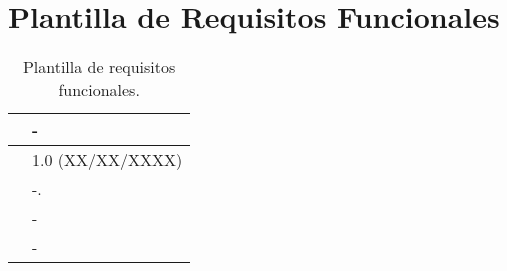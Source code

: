 \section{Plantilla de Requisitos Funcionales}

\begin{table}[H]
\begin{center}
\begin{tabular}{|p{3cm}|p{10cm}|} \hline
\centering {\bf FRQ-XX} & -  \\ \hline\hline
\centering {\bf Versión} & 1.0 (XX/XX/XXXX) \\ \hline
\centering {\bf Descripción} &  -. \\ \hline
\centering {\bf Importancia} & - \\ \hline
\centering {\bf Urgencia} & - \\ \hline
\end{tabular}
\caption{Plantilla de requisitos funcionales.}
\label{enlaceFRQX}
\end{center}
\end{table}